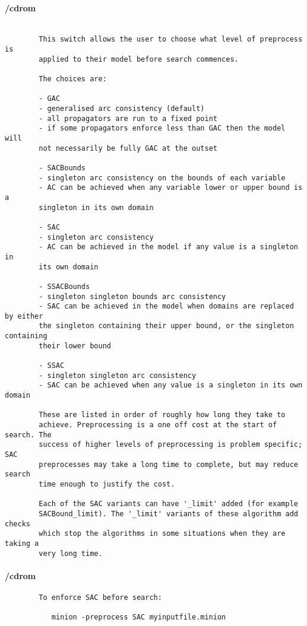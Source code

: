 \paragraph{/cdrom}
{\footnotesize
\begin{verbatim}

        This switch allows the user to choose what level of preprocess is
        applied to their model before search commences.

        The choices are:

        - GAC
        - generalised arc consistency (default)
        - all propagators are run to a fixed point
        - if some propagators enforce less than GAC then the model will
        not necessarily be fully GAC at the outset

        - SACBounds
        - singleton arc consistency on the bounds of each variable
        - AC can be achieved when any variable lower or upper bound is a
        singleton in its own domain

        - SAC
        - singleton arc consistency
        - AC can be achieved in the model if any value is a singleton in
        its own domain

        - SSACBounds
        - singleton singleton bounds arc consistency
        - SAC can be achieved in the model when domains are replaced by either
        the singleton containing their upper bound, or the singleton containing
        their lower bound

        - SSAC
        - singleton singleton arc consistency
        - SAC can be achieved when any value is a singleton in its own domain

        These are listed in order of roughly how long they take to
        achieve. Preprocessing is a one off cost at the start of search. The
        success of higher levels of preprocessing is problem specific; SAC
        preprocesses may take a long time to complete, but may reduce search
        time enough to justify the cost.

        Each of the SAC variants can have '_limit' added (for example
        SACBound_limit). The '_limit' variants of these algorithm add checks
        which stop the algorithms in some situations when they are taking a
        very long time.
\end{verbatim}
}
\paragraph{/cdrom}
{\footnotesize
\begin{verbatim}
        To enforce SAC before search:

           minion -preprocess SAC myinputfile.minion
\end{verbatim}
}
